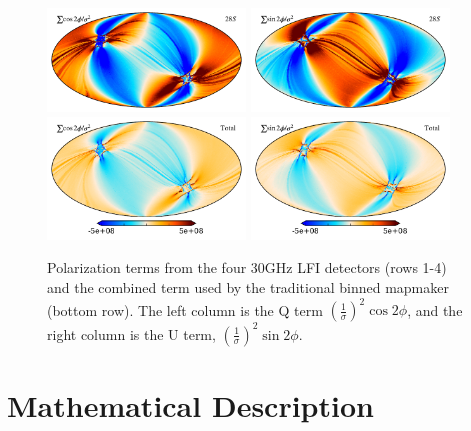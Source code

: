 \documentclass{aa}
\begin{document}
\begin{figure}
  \includegraphics[width=0.47\textwidth]{figs/map_Q_polang28S.pdf}
  \includegraphics[width=0.47\textwidth]{figs/map_U_polang28S.pdf}\\
  \includegraphics[width=0.47\textwidth]{figs/map_Q_polang_all.pdf}
  \includegraphics[width=0.47\textwidth]{figs/map_U_polang_all.pdf}\\
  \caption{Polarization terms from the four 30GHz LFI detectors (rows 1-4) and the combined term used by the traditional binned mapmaker (bottom row). The left column is the Q term $(\frac{1}{\sigma})^2\cos2\phi$, and the right column is the U term, $(\frac{1}{\sigma})^2\sin2\phi$.}
  \label{fig:polangles}
\end{figure}

\section{Mathematical Description}
\label{sec:mapmaking}
\end{document}
